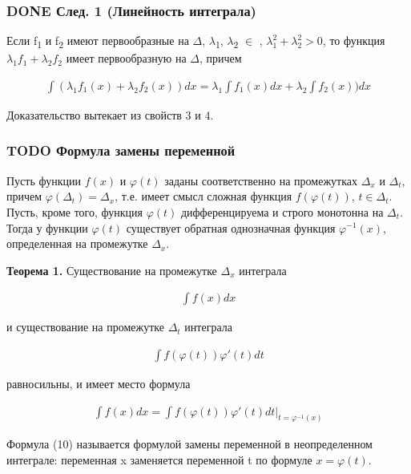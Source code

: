 \documentclass[11pt]{article}
\begin{document}
\subsubsection{{\bfseries\sffamily DONE} След. 1 (Линейность интеграла)}
\label{sec:org929a96c}
Если f\textsubscript{1} и f\textsubscript{2} имеют первообразные на \(\Delta\), \(\lambda\)\textsubscript{1}, \(\lambda\)\textsubscript{2} \(\in\) \R, \(\lambda_1^2+\lambda_2^2>0\), 
то функция \(\lambda_1 f_1+\lambda_2 f_2\) имеет первообразную на \(\Delta\), причем

\begin{eqnarray}
\int(\lambda_1 f_1(x)+\lambda_2 f_2(x))dx=\lambda_1\int f_1(x)dx+\lambda_2\int f_2(x))dx
\end{eqnarray}

Доказательство вытекает из свойств 3 и 4.
\subsubsection{{\bfseries\sffamily TODO} Формула замены переменной}
\label{sec:org6a4754d}
Пусть функции \(f(x)\) и \(\varphi(t)\) заданы соответственно на промежутках \(\Delta_x\) и \(\Delta_t\), 
причем \(\varphi (\Delta_t) = \Delta_x\), т.е. имеет смысл сложная функция \(f(\varphi(t))\), \(t \in \Delta_t\). 
Пусть, кроме того, функция \(\varphi(t)\) дифференцируема и строго монотонна на \(\Delta_t\). Тогда у функции \(\varphi(t)\)
существует обратная однозначная функция \(\varphi^{-1}(x)\), определенная на промежутке \(\Delta_x\).

\textbf{Теорема 1.} Существование на промежутке \(\Delta_x\) интеграла

  \begin{eqnarray}
\int f(x)dx
  \end{eqnarray}

и существование на промежутке \(\Delta_t\) интеграла

  \begin{eqnarray}
\int f(\varphi(t))\varphi'(t)dt
  \end{eqnarray}

равносильны, и имеет место формула

  \begin{eqnarray}
\int f(x)dx=\int f(\varphi(t))\varphi'(t)dt\bigg|_{t=\varphi^{-1}(x)}
  \end{eqnarray}

Формула (10) называется формулой замены переменной в неопределенном интеграле:
переменная x заменяется переменной t по формуле \(x = \varphi(t)\).
\end{document}
